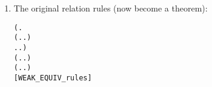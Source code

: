 \begin{enumerate}
\item The original relation rules (now become a theorem):
\begin{small}
\begin{alltt}
\HOLTokenTurnstile{} (\HOLSymConst{\HOLTokenForall{}}.
        (\HOLSymConst{\HOLTokenForall{}}.  \HOLTokenTransBegin{} \HOLTokenTransEnd {} \HOLSymConst{\HOLTokenImp{}} \HOLSymConst{\HOLTokenExists{}}.  \HOLTokenWeakTransBegin{} \HOLTokenWeakTransEnd {} \HOLSymConst{\HOLTokenConj{}}  \HOLSymConst{\HOLTokenWeakEQ} ) \HOLSymConst{\HOLTokenConj{}}
        \HOLSymConst{\HOLTokenForall{}}.  \HOLTokenTransBegin{} \HOLTokenTransEnd {} \HOLSymConst{\HOLTokenImp{}} \HOLSymConst{\HOLTokenExists{}}.  \HOLTokenWeakTransBegin{} \HOLTokenWeakTransEnd {} \HOLSymConst{\HOLTokenConj{}}  \HOLSymConst{\HOLTokenWeakEQ} ) \HOLSymConst{\HOLTokenConj{}}
   (\HOLSymConst{\HOLTokenForall{}}.  \HOLTokenTransBegin\HOLSymConst{\ensuremath{\tau}}\HOLTokenTransEnd {} \HOLSymConst{\HOLTokenImp{}} \HOLSymConst{\HOLTokenExists{}}.  \HOLSymConst{\HOLTokenEPS}  \HOLSymConst{\HOLTokenConj{}}  \HOLSymConst{\HOLTokenWeakEQ} ) \HOLSymConst{\HOLTokenConj{}}
   (\HOLSymConst{\HOLTokenForall{}}.  \HOLTokenTransBegin\HOLSymConst{\ensuremath{\tau}}\HOLTokenTransEnd {} \HOLSymConst{\HOLTokenImp{}} \HOLSymConst{\HOLTokenExists{}}.  \HOLSymConst{\HOLTokenEPS}  \HOLSymConst{\HOLTokenConj{}}  \HOLSymConst{\HOLTokenWeakEQ} ) \HOLSymConst{\HOLTokenImp{}}
    \HOLSymConst{\HOLTokenWeakEQ} \hfill{[WEAK_EQUIV_rules]}
\end{alltt}

\end{small}
\end{enumerate}
